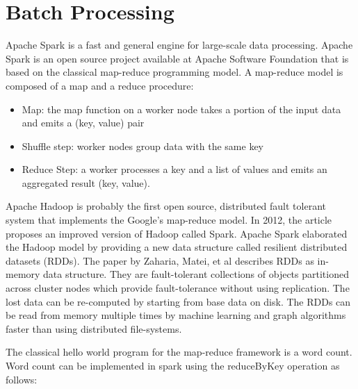 \documentclass{lmproj}
\begin{document}
\section{Batch Processing}
\label{relatedwork}

Apache Spark is a fast and general engine for large-scale data processing.  Apache Spark is an open source project available at Apache Software Foundation that is based on the classical map-reduce programming model. A map-reduce model is composed of a map and a reduce procedure:

\begin{itemize}
	\item Map: the map function on a worker node takes a portion of the input data and emits a (key, value) pair
	\item Shuffle step: worker nodes group data with the same key
	\item Reduce Step: a worker processes a key and a list of values and emits an aggregated result (key, value).
\end{itemize}

Apache Hadoop is probably the first open source, distributed fault tolerant system that implements the Google’s map-reduce model. In 2012, the article \cite{spark_2} proposes an improved version of Hadoop called Spark. Apache Spark elaborated the Hadoop model by providing a new data structure called resilient distributed datasets (RDDs). The paper by Zaharia, Matei, et al describes RDDs as in-memory data structure. They are fault-tolerant collections of objects partitioned across cluster nodes which provide fault-tolerance without using replication. The lost data can be re-computed by starting from base data on disk. The RDDs can be read from memory multiple times by machine learning and graph algorithms faster than using distributed file-systems.  

The classical hello world program for the map-reduce framework is a word count. Word count can be implemented in spark using the reduceByKey operation as follows:
\end{document}
